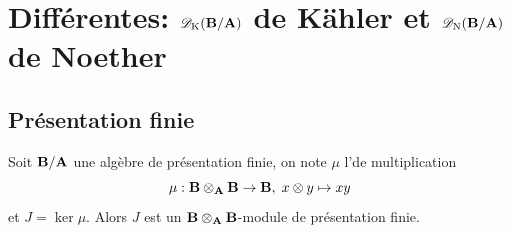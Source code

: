 \documentclass[12pt,twoside,a4paper]{article}
\begin{document}
\section {Différentes: $\mathscr{D}_{\rm K}(\mathbf{B}/\mathbf{A})$ de Kähler et $\mathscr{D}_{\rm N}(\mathbf{B}/\mathbf{A})$ de Noether}
\label{DifferentesSection}

\subsection{Présentation finie}
\begin {theorem} %
\label{PresentationFinieJ}

Soit $\mathbf{B}/\mathbf{A}$ une algèbre de présentation finie, on note $\mu$ l'\Ali de multiplication
\[\mu : \mathbf{B}\otimes_{\mathbf{A}}\mathbf{B} \to \mathbf{B},\;x\otimes y \mapsto xy\]  
et $J=\ker \mu$.
Alors $J$ est un $\mathbf{B}\otimes_{\mathbf{A}}\mathbf{B}$-module de présentation finie.
\end {theorem}
\end{document}
